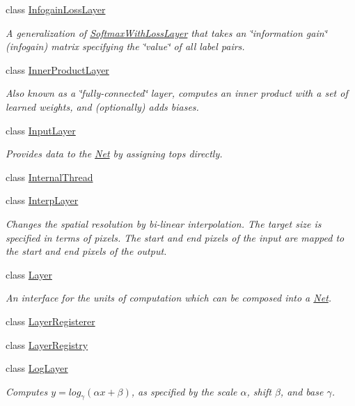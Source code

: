 \begin{DoxyCompactItemize}
class \hyperlink{classcaffe_1_1InfogainLossLayer}{Infogain\+Loss\+Layer}
\begin{DoxyCompactList}\small\item\em A generalization of \hyperlink{classcaffe_1_1SoftmaxWithLossLayer}{Softmax\+With\+Loss\+Layer} that takes an \char`\"{}information gain\char`\"{} (infogain) matrix specifying the \char`\"{}value\char`\"{} of all label pairs. \end{DoxyCompactList}\item 
class \hyperlink{classcaffe_1_1InnerProductLayer}{Inner\+Product\+Layer}
\begin{DoxyCompactList}\small\item\em Also known as a \char`\"{}fully-\/connected\char`\"{} layer, computes an inner product with a set of learned weights, and (optionally) adds biases. \end{DoxyCompactList}\item 
class \hyperlink{classcaffe_1_1InputLayer}{Input\+Layer}
\begin{DoxyCompactList}\small\item\em Provides data to the \hyperlink{classcaffe_1_1Net}{Net} by assigning tops directly. \end{DoxyCompactList}\item 
class \hyperlink{classcaffe_1_1InternalThread}{Internal\+Thread}
\item 
class \hyperlink{classcaffe_1_1InterpLayer}{Interp\+Layer}
\begin{DoxyCompactList}\small\item\em Changes the spatial resolution by bi-\/linear interpolation. The target size is specified in terms of pixels. The start and end pixels of the input are mapped to the start and end pixels of the output. \end{DoxyCompactList}\item 
class \hyperlink{classcaffe_1_1Layer}{Layer}
\begin{DoxyCompactList}\small\item\em An interface for the units of computation which can be composed into a \hyperlink{classcaffe_1_1Net}{Net}. \end{DoxyCompactList}\item 
class \hyperlink{classcaffe_1_1LayerRegisterer}{Layer\+Registerer}
\item 
class \hyperlink{classcaffe_1_1LayerRegistry}{Layer\+Registry}
\item 
class \hyperlink{classcaffe_1_1LogLayer}{Log\+Layer}
\begin{DoxyCompactList}\small\item\em Computes $ y = log_{\gamma}(\alpha x + \beta) $, as specified by the scale $ \alpha $, shift $ \beta $, and base $ \gamma $. \end{DoxyCompactList}\item 

\end{DoxyCompactItemize}
